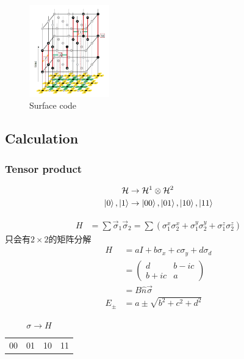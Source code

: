 \begin{figure}[!htb]
    \centering
    \includegraphics[width=0.309\textwidth]{pic/Review/Surface code}
    \caption{Surface code}
\end{figure}


\subsection{Calculation}
\subsubsection{Tensor product}
\begin{align*}
    \mathcal{H}&\rightarrow\mathcal{H}^1\otimes \mathcal{H}^2\\
    \ket{0}, \ket{1}&\rightarrow \ket{00}, \ket{01}, \ket{10}, \ket{11}
\end{align*}

\begin{align*}
    H&=\sum \vec{\sigma}_1\vec{\sigma}_2=\sum(\sigma_1^x\sigma_2^x+\sigma_1^y\sigma_2^y+\sigma_1^z\sigma_2^z)
\end{align*}
只会有$2\times2$的矩阵分解 
\begin{align*}
    H&=aI+b\sigma_x+c\sigma_y+d\sigma_d\\
    &=\begin{pmatrix}
        d & b-ic\\
        b+ic & a
    \end{pmatrix}\\
    &=B\hat{n}\vec{\sigma}\\
    E_\pm&=a\pm\sqrt{b^2+c^2+d^2}
\end{align*}

\begin{table}[H]
    \centering
    \caption{$\sigma\rightarrow H$}
    \begin{tabular}[c]{cccc}
        00 & 01 & 10 & 11\\
    \end{tabular}
\end{table}


